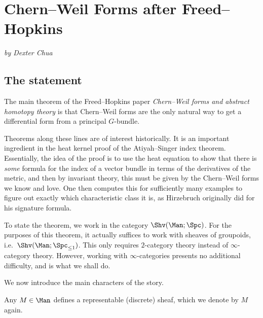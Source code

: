 
\section{Chern--Weil Forms after Freed--Hopkins}\label{WorkofFreedHopkins}

\textit{by Dexter Chua}



\subsection{The statement}\label{section:statement}

The main theorem of the Freed--Hopkins paper \emph{Chern--Weil forms and abstract homotopy theory} \cite{FreedHopkins} is that Chern--Weil forms are the only natural way to get a differential form from a principal $G$-bundle.

Theorems along these lines are of interest historically. It is an important ingredient in the heat kernel proof of the Atiyah--Singer index theorem. Essentially, the idea of the proof is to use the heat equation to show that there is \emph{some} formula for the index of a vector bundle in terms of the derivatives of the metric, and then by invariant theory, this must be given by the Chern--Weil forms we know and love. One then computes this for sufficiently many examples to figure out exactly which characteristic class it is, as Hirzebruch originally did for his signature formula.

To state the theorem, we work in the category $\Shv(\Man;\Spc)$. 
For the purposes of this theorem, it actually suffices to work with sheaves of groupoids, i.e.\ $\Shv(\Man;\Spc_{\leq 1})$. 
This only requires $2$-category theory instead of $\infty$-category theory. 
However, working with $\infty$-categories presents no additional difficulty, and is what we shall do.

We now introduce the main characters of the story.
\begin{example}
  Any $M \in \Man$ defines a representable (discrete) sheaf, which we denote by $M$ again.
\end{example}

